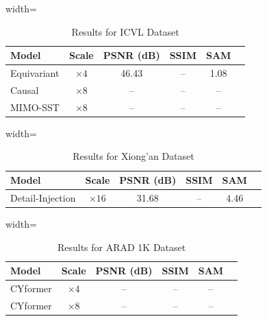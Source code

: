 \documentclass[conference]{IEEEtran}
\begin{document}
\begin{table}[htbp]
\caption{Results for ICVL Dataset \cite{icvl_dataset}}
\begin{center}
\begin{adjustbox}{width=\columnwidth}
\begin{tabular}{lccccc}
\toprule
\textbf{Model} & \textbf{Scale} & \textbf{PSNR (dB)} & \textbf{SSIM} & \textbf{SAM} \\
\midrule
Equivariant \cite{wang2026equivariant} & $\times 4$ & 46.43 & -- & 1.08 \\
Causal \cite{liu2026causal} & $\times 8$ & -- & -- & -- \\
MIMO-SST \cite{fang2024mimosst} & $\times 8$ & -- & -- & -- \\
\bottomrule
\end{tabular}
\end{adjustbox}
\label{tab:icvl}
\end{center}
\end{table}

\begin{table}[htbp]
\caption{Results for Xiong'an Dataset \cite{xiongan_dataset}}
\begin{center}
\begin{adjustbox}{width=\columnwidth}
\begin{tabular}{lccccc}
\toprule
\textbf{Model} & \textbf{Scale} & \textbf{PSNR (dB)} & \textbf{SSIM} & \textbf{SAM} \\
\midrule
Detail-Injection \cite{fang2026detail} & $\times 16$ & 31.68 & -- & 4.46 \\
\bottomrule
\end{tabular}
\end{adjustbox}
\label{tab:xiongan}
\end{center}
\end{table}

\begin{table}[htbp]
\caption{Results for ARAD 1K Dataset \cite{arad1k_dataset}}
\begin{center}
\begin{adjustbox}{width=\columnwidth}
\begin{tabular}{lccccc}
\toprule
\textbf{Model} & \textbf{Scale} & \textbf{PSNR (dB)} & \textbf{SSIM} & \textbf{SAM} \\
\midrule
CYformer \cite{chen2025cyformer} & $\times 4$ & -- & -- & -- \\
CYformer \cite{chen2025cyformer} & $\times 8$ & -- & -- & -- \\
\bottomrule
\end{tabular}
\end{adjustbox}
\label{tab:arad}
\end{center}
\end{table}
\end{document}
